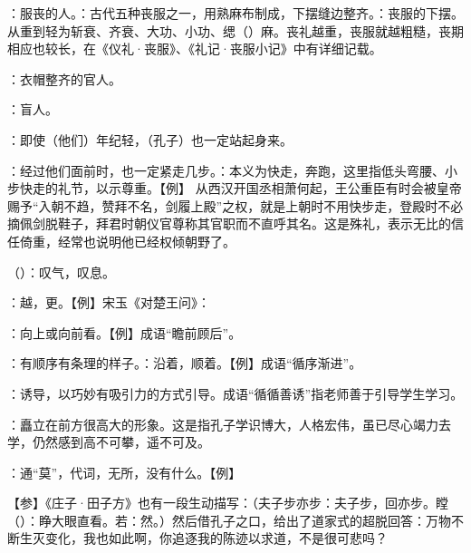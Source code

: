 {
\item {}：服丧的人。：古代五种丧服之一，用熟麻布制成，下摆缝边整齐。：丧服的下摆。从重到轻为斩衰、齐衰、大功、小功、缌（）麻。丧礼越重，丧服就越粗糙，丧期相应也较长，在《仪礼·丧服》、《礼记·丧服小记》中有详细记载。
\item {}：衣帽整齐的官人。
\item {}：盲人。
\item {}：即使（他们）年纪轻，（孔子）也一定站起身来。
\item {}：经过他们面前时，也一定紧走几步。：本义为快走，奔跑，这里指低头弯腰、小步快走的礼节，以示尊重。【例】 从西汉开国丞相萧何起，王公重臣有时会被皇帝赐予“入朝不趋，赞拜不名，剑履上殿”之权，就是上朝时不用快步走，登殿时不必摘佩剑脱鞋子，拜君时朝仪官尊称其官职而不直呼其名。这是殊礼，表示无比的信任倚重，经常也说明他已经权倾朝野了。
}
{}


{
\begin{lyitemize}
\item {}（）：叹气，叹息。
\item {}：越，更。【例】宋玉《对楚王问》：
\item {}：向上或向前看。【例】成语“瞻前顾后”。
\item {}：有顺序有条理的样子。：沿着，顺着。【例】成语“循序渐进”。

：诱导，以巧妙有吸引力的方式引导。成语“循循善诱”指老师善于引导学生学习。
\item {}：矗立在前方很高大的形象。这是指孔子学识博大，人格宏伟，虽已尽心竭力去学，仍然感到高不可攀，遥不可及。

\item {}：通“莫”，代词，无所，没有什么。【例】 
\end{lyitemize}
【参】《庄子·田子方》也有一段生动描写：（夫子步亦步：夫子步，回亦步。瞠（）：睁大眼直看。若：然。）然后借孔子之口，给出了道家式的超脱回答：万物不断生灭变化，我也如此啊，你追逐我的陈迹以求道，不是很可悲吗？} %
{}



